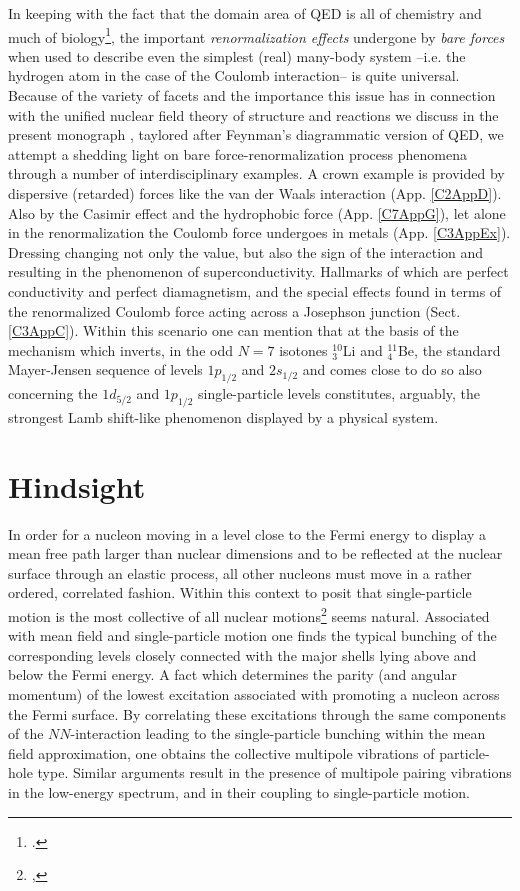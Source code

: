 In keeping with the fact that the domain area of QED is all of chemistry and much of biology\footnote{\cite{Feynman:06}.}, the important \textit{renormalization effects} undergone by \textit{bare forces} when used to describe even the simplest (real) many-body system --i.e. the hydrogen atom in the case of the Coulomb interaction-- is quite universal. Because of the variety of facets and the importance this issue has in connection with the unified nuclear field theory of structure and reactions we discuss in the present monograph , taylored after Feynman's diagrammatic version of QED, we attempt a shedding light on bare force-renormalization process phenomena through a number of interdisciplinary examples. A crown example is provided by dispersive (retarded) forces like the van der Waals interaction (App. \ref{C2AppD}). Also by the Casimir effect and the hydrophobic force (App. \ref{C7AppG}), let alone in the renormalization the Coulomb force undergoes in metals (App. \ref{C3AppEx}). Dressing changing not only the value, but also the sign of the interaction and resulting in the phenomenon of superconductivity. Hallmarks of which are perfect conductivity and perfect diamagnetism, and the special effects found in terms of the renormalized Coulomb force acting across a Josephson junction (Sect. \ref{C3AppC}). Within this scenario one can mention that at the basis of the mechanism which inverts, in the odd $N=7$ isotones $^{10}_3$Li and $^{11}_4$Be, the standard Mayer-Jensen sequence of levels $1p_{1/2}$ and $2s_{1/2}$ and comes close to do so also concerning the $1d_{5/2}$ and $1p_{1/2}$ single-particle levels constitutes, arguably, the strongest Lamb shift-like phenomenon displayed by a physical system.
\section{Hindsight}\label{Sect1.10}
In order for a nucleon moving in a level close to the Fermi energy to display a mean free path larger than nuclear dimensions and to be reflected at the nuclear surface through an elastic process, all other nucleons must move in a rather ordered, correlated fashion. Within this context to posit that single-particle motion is the most collective of all nuclear motions\footnote{\cite{Mottelson:62},} seems natural. Associated with mean field and single-particle motion one finds the typical bunching of the corresponding levels closely connected with the major shells lying above and below the Fermi energy. A fact which determines the parity (and angular momentum) of the lowest excitation associated with promoting  a nucleon across the Fermi surface.  By correlating these excitations through the same components of the $NN$-interaction leading to the single-particle bunching within the mean field approximation, one obtains the collective multipole  vibrations of particle-hole type. Similar arguments result in the presence of multipole pairing vibrations in the low-energy spectrum, and in their coupling to single-particle motion.


